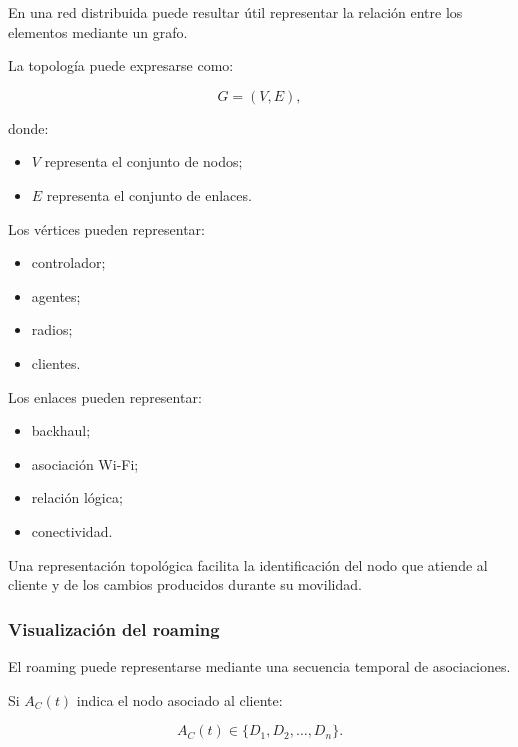 En una red distribuida puede resultar útil representar la relación entre
los elementos mediante un grafo.

La topología puede expresarse como:

\[
    G
    =
    (V,E),
\]

donde:

\begin{itemize}
    \item \(V\) representa el conjunto de nodos;

    \item \(E\) representa el conjunto de enlaces.
\end{itemize}

Los vértices pueden representar:

\begin{itemize}
    \item controlador;

    \item agentes;

    \item radios;

    \item clientes.
\end{itemize}

Los enlaces pueden representar:

\begin{itemize}
    \item backhaul;

    \item asociación Wi-Fi;

    \item relación lógica;

    \item conectividad.
\end{itemize}

Una representación topológica facilita la identificación del nodo que
atiende al cliente y de los cambios producidos durante su movilidad.


\subsubsection*{Visualización del roaming}

El roaming puede representarse mediante una secuencia temporal de
asociaciones.

Si \(A_C(t)\) indica el nodo asociado al cliente:

\[
    A_C(t)
    \in
    \{
        D_1,
        D_2,
        \ldots,
        D_n
    \}.
\]

